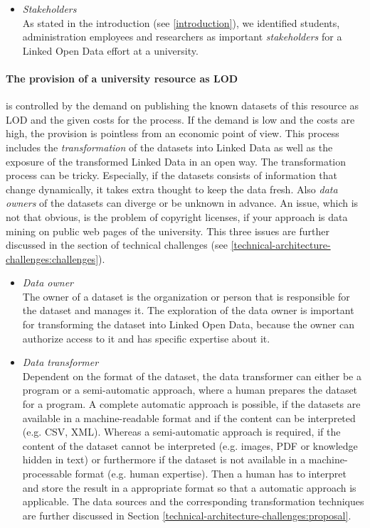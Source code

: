 \documentclass{article}
\begin{document}
\begin{itemize}
\item \textit{Stakeholders}~\\
As stated in the introduction (see \ref{introduction}), we identified students, administration employees and researchers as important \textit{stakeholders} for a Linked Open Data effort at a university.

\end{itemize}

\paragraph{The provision of a university resource as LOD}
\label{technical-architecture-challenges:lod-effort:provision-resources}
is controlled by the demand on publishing the known datasets of this resource as LOD and the given costs for the process. If the demand is low and the costs are high, the provision is pointless from an economic point of view. This process includes the \textit{transformation} of the datasets into Linked Data as well as the exposure of the transformed Linked Data in an open way. The transformation process can be tricky. Especially, if the datasets consists of information that change dynamically, it takes extra thought to keep the data fresh. Also \textit{data owners} of the datasets can diverge or be unknown in advance. An issue, which is not that obvious, is the problem of copyright licenses, if your approach is data mining on public web pages of the university. This three issues are further discussed in the section of technical challenges (see \ref{technical-architecture-challenges:challenges}).

\begin{itemize}
\item \textit{Data owner}~\\
The owner of a dataset is the organization or person that is responsible for the dataset and manages it. The exploration of the data owner is important for transforming the dataset into Linked Open Data, because the owner can authorize access to it and has specific expertise about it. 

\item \textit{Data transformer}~\\
Dependent on the format of the dataset, the data transformer can either be a program or a semi-automatic approach, where a human prepares the dataset for a program. A complete automatic approach is possible, if the datasets are available in a machine-readable format and if the content can be interpreted (e.g. CSV, XML). Whereas a semi-automatic approach is required, if the content of the dataset cannot be interpreted (e.g. images, PDF or knowledge hidden in text) or furthermore if the dataset is not available in a machine-processable format (e.g. human expertise). Then a human has to interpret and store the result in a appropriate format so that a automatic approach is applicable. The data sources and the corresponding transformation techniques are further discussed in Section \ref{technical-architecture-challenges:proposal}.

\end{itemize}
\end{document}
